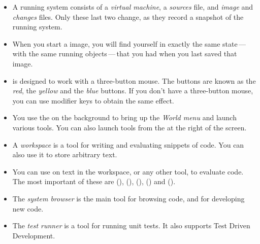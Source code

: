 \documentclass[a4paper,10pt,twoside]{book}
\begin{document}
\begin{itemize}
  \item A running \sq system consists of a \emph{virtual machine}, a \emph{sources} file, and \emph{image} and \emph{changes} files. Only these last two change, as they record a snapshot of the running system.
  \item When you start a \sq image, you will find yourself in exactly the same state\,---\,with the same running objects\,---\,that you had when you last saved that image.
  \item \sq is designed to work with a three-button mouse. The buttons are known as the \emph{red}, the \emph{yellow} and the \emph{blue} buttons. If you don't have a three-button mouse, you can use modifier keys to obtain the same effect.
  \item You use the  on the \sq background to bring up the \emph{World menu} and launch various tools. You can also launch tools from the \toolsflapind at the right of the \sq screen.
  \item A \emph{workspace} is a tool for writing and evaluating snippets of code. You can also use it to store arbitrary text.
  \item You can use  on text in the workspace, or any other tool, to evaluate code. The most important of these are  (),  (),  (),  () and  ().
  \item The \emph{system browser} is the main tool for browsing \sq code, and for developing new code.
  \item The \emph{test runner} is a tool for running unit tests. It also supports Test Driven Development.
\end{itemize}

\ifx\wholebook\relax\else 
   
   
\end{document}
